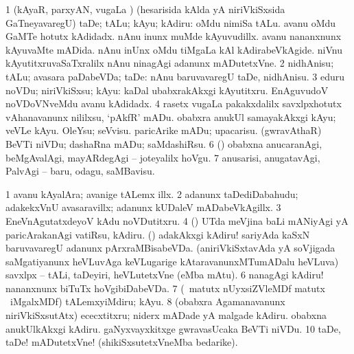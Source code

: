 \noindent 
\gl{\akirx}
\expl{}
\bmng
\bnum
\num{1} (kAyaR, parxyAN, \mo vugaLa \vi) (hesarisida kAlda yA niriVkiSxsida GaTneyavaregU) taDe; tALu; kAyu; kAdiru:  oMdu nimiSa tALu.  avanu oMdu GaMTe hotutx kAdidadx.  nAnu inunx muMde kAyuvudillx.  avanu nananxnunx kAyuvaMte mADida.  nAnu inUnx oMdu tiMgaLa kAl kAdirabeVkAgide.  niVnu kAyutitxruvaSaTxralilx nAnu ninagAgi adanunx mADutetxVne. 
\num{2} nidhAnisu; tALu; avasara paDabeVDa; taDe:  nAnu baruvavaregU taDe, nidhAnisu. 
\num{3} eduru noVDu; niriVkiSxsu; kAyu:  kaDal ubabxrakAkxgi kAyutitxru.  EnAguvudoV noVDoVNveMdu avanu kAdidadx. 
\num{4} rasetx \mo vugaLa pakakxdalilx savxlpxhotutx vAhanavanunx nililxsu, `pAkfR' mADu. 
\banum
{} obabxra anukUl samayakAkxgi kAyu; veVLe kAyu. 
 OleYsu; seVvisu. 
 paricArike mADu; upacarisu. 
 (gwravAthaR) BeVTi niVDu; dashaRna mADu; saMdashiRsu. 
\eanum
\numie
\num{6} (\pArxparx) obabxna anucaranAgi, beMgAvalAgi, mayARdegAgi -- joteyalilx hoVgu. 
\num{7} anusarisi, anugatavAgi, PalvAgi -- baru, odagu, saMBavisu. 
\enum
\emng

\noindent 
\gl{\pagu}
\expl{}
\bmng
\bnum
\num{1}  avanu kAyalAra; avanige tALemx illx. 
\num{2}  adanunx taDediDabahudu; adakekxVnU avasaravillx; adanunx kUDaleV mADabeVkAgillx. 
\num{3}  EneVnAgutatxdeyoV kAdu noVDutitxru. 
\num{4} \eng{wait at [\textit{or}} (\ame) \eng{on] table} UTda meVjina baLi mANiyAgi yA paricArakanAgi vatiRsu, kAdiru. 
  (\AmA) 
\banum
{} adakAkxgi kAdiru! sariyAda kaSxN baruvavaregU adanunx pArxraMBisabeVDa. 
 (aniriVkiSxtavAda yA soVjigada saMgatiyanunx heVLuvAga keVLugarige kAtaravanunxMTumADalu heVLuva) savxlpx -- tALi, taDeyiri, heVLutetxVne (eMba mAtu). 
\eanum
\numie
\num{6}  nanagAgi kAdiru! nananxnunx biTuTx hoVgibiDabeVDa. 
\num{7}  (\AseTxrXV\ matutx nUyxsiZVleMDf matutx \kanu\ iMgalxMDf) tALemxyiMdiru; kAyu. 
\num{8}  (obabxra Agamanavanunx niriVkiSxsutAtx) ececxtitxru; niderx mADade yA malgade kAdiru. 
  
\banum
{} obabxna anukUlkAkxgi kAdiru. 
 gaNyxvayxkitxge gwravasUcaka BeVTi niVDu. 
\eanum
\numie
\num{10}  taDe, taDe! mADutetxVne! (shikiSxsutetxVneMba bedarike). 
\enum
\emng
\eentry

